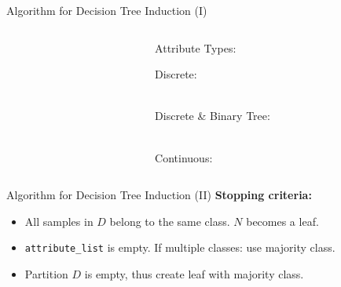 \begin{frame}{Algorithm for Decision Tree Induction (I)}
\begin{columns}
\begin{column}{0.75\textwidth}
		\end{column}
		\begin{column}{0.25\textwidth}
			\vspace*{-3em}
			\centering

			Attribute Types:
			\small

			Discrete:
			\begin{figure}[t]
				\centering
				
			\end{figure}
			~ \\\bigskip
			Discrete \& Binary Tree:
			\begin{figure}[t]
				\centering
				
			\end{figure}

			~ \\\bigskip
			Continuous:
			\begin{figure}[t]
				\centering
				
			\end{figure}

		\end{column}
	\end{columns}


\end{frame}

\begin{frame}{Algorithm for Decision Tree Induction (II)}
	\textbf{Stopping criteria:}
	\begin{itemize}
		\item All samples in $D$ belong to the same class. $N$ becomes a leaf.
		\item \texttt{attribute\_list} is empty. If multiple classes: use majority class.
		\item Partition $D$ is empty, thus create leaf with majority class.
	\end{itemize}
\end{frame}

